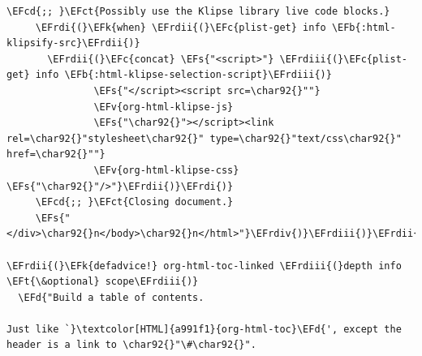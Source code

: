 \documentclass{scrartcl}
\newcommand{\EFk}[1]{\textcolor{EFk}{#1}} %
\newcommand{\EFd}[1]{\textcolor{EFd}{#1}} %
\newcommand{\EFt}[1]{\textcolor{EFt}{#1}} %
\newcommand{\EFs}[1]{\textcolor{EFs}{#1}} %
\newcommand{\EFb}[1]{\textcolor{EFb}{#1}} %
\newcommand{\EFct}[1]{\textcolor{EFct}{#1}} %
\newcommand{\EFc}[1]{\textcolor{EFc}{#1}} %
\newcommand{\EFv}[1]{\textcolor{EFv}{#1}} %
\newcommand{\EFcd}[1]{\textcolor{EFcd}{#1}} %
\newcommand{\EFrdi}[1]{#1} %
\newcommand{\EFrdii}[1]{#1} %
\newcommand{\EFrdiii}[1]{#1} %
\newcommand{\EFrdiv}[1]{#1} %
\begin{document}
\begin{Code}
\begin{Verbatim}[]
     \EFcd{;; }\EFct{Possibly use the Klipse library live code blocks.}
     \EFrdi{(}\EFk{when} \EFrdii{(}\EFc{plist-get} info \EFb{:html-klipsify-src}\EFrdii{)}
       \EFrdii{(}\EFc{concat} \EFs{"<script>"} \EFrdiii{(}\EFc{plist-get} info \EFb{:html-klipse-selection-script}\EFrdiii{)}
               \EFs{"</script><script src=\char92{}""}
               \EFv{org-html-klipse-js}
               \EFs{"\char92{}"></script><link rel=\char92{}"stylesheet\char92{}" type=\char92{}"text/css\char92{}" href=\char92{}""}
               \EFv{org-html-klipse-css} \EFs{"\char92{}"/>"}\EFrdii{)}\EFrdi{)}
     \EFcd{;; }\EFct{Closing document.}
     \EFs{"</div>\char92{}n</body>\char92{}n</html>"}\EFrdiv{)}\EFrdiii{)}\EFrdii{)}

\EFrdii{(}\EFk{defadvice!} org-html-toc-linked \EFrdiii{(}depth info \EFt{\&optional} scope\EFrdiii{)}
  \EFd{"Build a table of contents.

Just like `}\textcolor[HTML]{a991f1}{org-html-toc}\EFd{', except the header is a link to \char92{}"\#\char92{}".


\end{Verbatim}
\end{Code}
\end{document}
